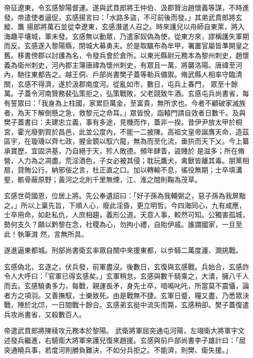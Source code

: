 \begin{pinyinscope}
 帝征遼東，令玄感黎陽督運。遂與武賁郎將王仲伯、汲郡贊治趙懷義等謀，不時進發。帝遣使者逼促，玄感揚言曰：「水路多盜，不可前後而發。」其弟武賁郎將玄縱、鷹
 揚郎將萬石並從幸遼東，玄感潛遣人召之。時來護兒以舟師自東萊，將入海趣平壤城，軍未發。玄感無以動眾，乃遣家奴偽為使，從東方來，謬稱護失軍期而反。玄感遂入黎陽縣，閉城大募勇夫。於是取颿布為牟甲，署置官屬皆準開皇之舊。移書傍郡以討護為名，令發兵會於倉所。以東光縣尉元務本為黎州刺史，趙懷義為衛州刺史，河內郡主簿唐禕為懷州刺史，有眾且一萬，將襲洛陽。唐禕至河內，馳往東都告之。越王侗、戶部尚書樊子蓋等勒兵備禦。脩武縣人相率守臨清關，玄感不得濟，遂於汲郡南度河。從亂如市，數日，屯兵上春門，
 眾至十餘萬。子蓋令河南贊務裴弘策拒之，弘策戰敗，父老競致牛酒。玄感屯兵尚書省，每有誓眾曰：「我身為上柱國，家累巨萬金，至富貴，無所求也。今者不顧破家滅族者，為天下解倒懸之急，救黎元之命耳。」眾皆悅，詣轅門請自效者日數千。及與樊子蓋書曰：夫建忠立義，事有多途，見機而作，蓋非一揆。昔伊尹放太甲於桐宮，霍光廢劉賀於昌邑，此並公度內，不能一二披陳。高祖文皇帝誕膺天命，造茲區宇，在璇璣以齊七政，握金鏡以馭六龍，無為而至化流，垂拱而天下乂。今上纂承寶歷，宜固洪基，乃自絕于天，殄人敗德。頻年肆眚，盜賤於
 是滋多；所在脩營，人力為之凋盡。荒淫酒色，子女必被其侵；耽玩鷹犬，禽獸皆離其毒。朋黨相扇，貸賄公行，納邪佞之言，杜正直之口。加以轉輸不息，徭役無期；士卒填溝壑，骸骨蔽原野；黃河之北則千里無煙，江、淮之間則鞠為茂草。



 玄感世荷國恩，位居上將。先公奉遺詔曰：「好子孫為我輔弼之，惡子孫為我屏黜之。」所以上稟先旨，下順人心，廢此淫昏，更立明哲。今四海同心，九有咸應，士卒用命，如赴私仇，人庶相趨，義形公道。天意人事，較然可知。公獨害孤城，勢何支久？願以黔黎在念，社稷為心，勿拘小禮，自貽伊戚。誰謂國家，一旦至此！執筆潸
 然，言無所具。



 遂進逼東都城。刑部尚書衛玄率眾自關中來援東都，以步騎二萬度瀍、澗挑戰。



 玄感偽北，玄逐之，伏兵發，前軍盡沒。後數日，玄復與玄感戰。兵始合，玄感詐令人大呼曰：「官軍已得玄感矣。」玄軍稍怠，玄感與數千騎乘之，大潰，擁八千人而去。玄感驍勇多力，每戰，親運長矛，身先士卒，喑鳴叱吒，所當莫不震懾，論者方之項羽。又善撫馭，士樂致死。由是戰無不捷。玄軍日蹙，糧又盡，乃悉眾決戰，陣於北邙，一日間戰十餘合。玄感弟玄挺中流矢而斃，玄感稍卻。樊子蓋復遣兵攻尚書省，又殺數百人。



 帝遣武賁郎將陳稜攻元務本於黎陽。
 武衛將軍屈突通屯河陽，左翊衛大將軍宇文述發兵繼進，右驍衛大將軍來護兒復來趙援。玄感與前戶部尚書李子雄計曰：「屈突通曉兵事，若度河則勝負難決，不如分兵拒之。不能濟，則樊、衛失援。」




\end{pinyinscope}

